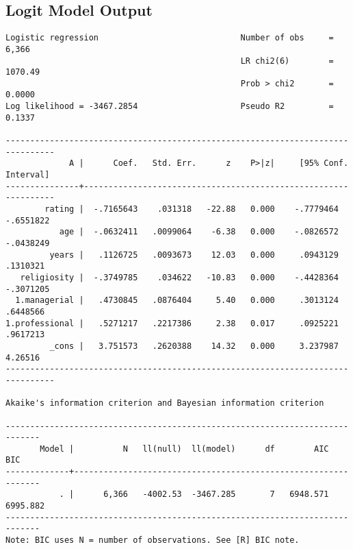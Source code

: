 \documentclass{article}
\begin{document}
\newpage
\hypertarget{logitoutput}{\subsection*{Logit Model Output}}
\begin{verbatim}
Logistic regression                             Number of obs     =      6,366
                                                LR chi2(6)        =    1070.49
                                                Prob > chi2       =     0.0000
Log likelihood = -3467.2854                     Pseudo R2         =     0.1337

--------------------------------------------------------------------------------
             A |      Coef.   Std. Err.      z    P>|z|     [95% Conf. Interval]
---------------+----------------------------------------------------------------
        rating |  -.7165643    .031318   -22.88   0.000    -.7779464   -.6551822
           age |  -.0632411   .0099064    -6.38   0.000    -.0826572   -.0438249
         years |   .1126725   .0093673    12.03   0.000     .0943129    .1310321
   religiosity |  -.3749785    .034622   -10.83   0.000    -.4428364   -.3071205
  1.managerial |   .4730845   .0876404     5.40   0.000     .3013124    .6448566
1.professional |   .5271217   .2217386     2.38   0.017     .0925221    .9617213
         _cons |   3.751573   .2620388    14.32   0.000     3.237987     4.26516
--------------------------------------------------------------------------------

Akaike's information criterion and Bayesian information criterion

-----------------------------------------------------------------------------
       Model |          N   ll(null)  ll(model)      df        AIC        BIC
-------------+---------------------------------------------------------------
           . |      6,366   -4002.53  -3467.285       7   6948.571   6995.882
-----------------------------------------------------------------------------
Note: BIC uses N = number of observations. See [R] BIC note.
\end{verbatim}
\end{document}
